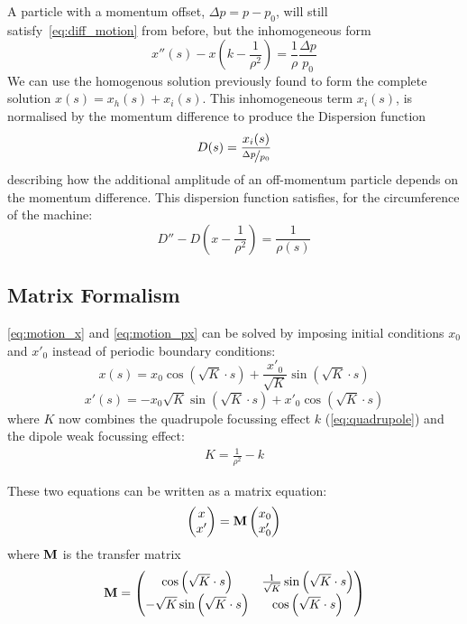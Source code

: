 \documentclass[11pt]{report}
\begin{document}
A particle with a momentum offset, $\Delta p = p-p_0$, will still satisfy~\ref{eq:diff_motion} from before, but the inhomogeneous form
\begin{equation}
  x''(s)-x\left(k-\frac 1{\rho^2}\right)=\frac 1\rho\frac{\Delta p}{p_0}
\end{equation}
We can use the homogenous solution previously found to form the complete solution $x(s)=x_h(s)+x_i(s)$. This inhomogeneous term $x_i(s)$, is normalised by the momentum difference to produce the Dispersion function
\begin{equation}
  D(s)=\frac{x_i(s)}{\nicefrac{\Delta p}{p_0}}
  \label{eq:dispersion}
\end{equation} describing how the additional amplitude of an off-momentum particle depends on the momentum difference. 
This dispersion function satisfies, for the circumference of the machine:
\begin{equation}
  D''-D\left(x-\frac1{\rho^2}\right)=\frac 1{\rho(s)}
\end{equation}

\subsection{Matrix Formalism}\label{sec:matrix}

\autoref{eq:motion_x} and \autoref{eq:motion_px} can be solved by imposing initial conditions $x_0$ and $x'_0$ instead of periodic boundary conditions:
\begin{equation}
  x(s)=x_0\cos\left(\sqrt{K}\cdot s\right)+\frac{x'_0}{\sqrt{K}}\sin\left(\sqrt{K}\cdot s\right)
\end{equation}
\begin{equation}
  x'(s)=-x_0\sqrt{K}\sin\left(\sqrt{K}\cdot s\right)+x'_0\cos\left(\sqrt{K}\cdot s\right)
\end{equation}
where $K$ now combines the quadrupole focussing effect $k$ (\autoref{eq:quadrupole}) and the dipole weak focussing effect:
\begin{eqnarray}
  K=\frac1{\rho^2}-k
\end{eqnarray}

These two equations can be written as a matrix equation:
\begin{equation}
  \begin{pmatrix}
    x \\
    x'
  \end{pmatrix}
  =
  \bf{M}
  \begin{pmatrix}
    x_0 \\
    x'_0
  \end{pmatrix}
\end{equation}
where $\bf{M}$ is the transfer matrix
\begin{equation}
  \bf{M}=
  \begin{pmatrix}
    \cos\left(\sqrt{K}\cdot s\right) & \frac1{\sqrt{K}}\sin\left(\sqrt{K}\cdot s\right) \\
    -\sqrt{K}\sin\left(\sqrt{K}\cdot s\right) & \cos\left(\sqrt{K}\cdot s\right)
  \end{pmatrix}
\end{equation}
\end{document}
